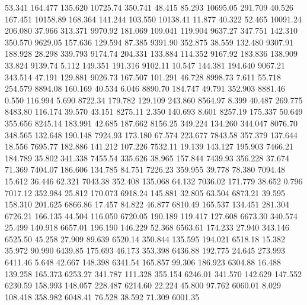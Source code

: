   53.341  164.477  135.620     10725.74
 350.741   48.415   85.293     10695.05
 291.709   40.526  167.451     10158.89
 168.364  141.244  103.550     10138.41
  11.877   40.322   52.465     10091.24
 206.080   37.966  313.371      9970.92
 181.069  109.041  119.904      9637.27
 347.751  142.310  350.570      9629.05
 157.636  129.594   87.385      9391.90
 352.875   38.559  132.480      9307.91
 188.928   28.298  339.793      9174.74
 204.331  133.884  114.352      9167.92
 183.836  138.909   33.824      9139.74
   5.112  149.351  191.316      9102.11
  10.547  144.381  194.640      9067.21
 343.514   47.191  129.881      9026.73
 167.507  101.291   46.728      8998.73
   7.611   55.718  254.579      8894.08
 160.169   40.534    6.046      8890.70
 184.747   49.791  352.903      8881.46
   0.550  116.994    5.690      8722.34
 179.782  129.109  243.860      8564.97
   8.399   40.487  269.775      8483.80
 116.174   39.570   43.151      8275.11
   2.350  140.693    8.601      8257.19
 175.337   50.649  355.656      8245.14
 183.991   42.685  187.662      8156.25
 349.224  134.260  344.047      8076.70
 348.565  132.648  190.148      7924.93
 173.180   67.574  223.677      7843.58
 357.379  137.644   18.556      7695.77
 182.886  141.212  107.226      7532.11
  19.139  143.127  195.903      7466.21
 184.789   35.802  341.338      7455.54
 335.626   38.965  157.844      7439.93
 356.228   37.674   71.369      7404.07
 186.606  134.785   84.751      7226.23
 359.955   39.778   78.380      7094.48
  15.612   36.446   62.321      7043.38
 352.408  135.068   64.132      7036.02
 171.779   38.652    0.796      7017.12
 352.984   25.812  170.073      6918.24
 145.881   32.805   63.504      6873.21
  39.595  158.310  201.625      6866.86
  17.457   84.822   46.877      6810.49
 165.537  134.451  281.304      6726.21
 166.135   44.504  116.050      6720.05
 190.189  119.417  127.608      6673.30
 340.574   25.499  140.918      6657.01
 196.190  146.229   52.368      6563.61
 174.233   27.940  343.146      6525.50
  45.258   27.909   89.639      6520.14
 350.844  135.595  194.021      6518.18
  15.382   35.972   90.990      6439.85
 175.693   46.173  353.398      6436.88
 192.775   24.645  273.993      6411.46
   5.648   42.667  148.398      6341.54
 165.857   99.306  186.923      6304.88
  16.488  139.258  165.373      6253.27
 341.787  111.328  355.154      6246.01
 341.570  142.629  147.552      6230.59
 158.993  148.057  228.487      6214.60
  22.224   45.800   97.762      6060.01
   8.029  108.418  358.982      6048.41
  76.528   38.592   71.309      6001.35
